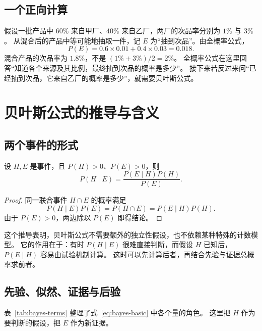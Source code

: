 \documentclass[UTF8]{ctexart}
\begin{document}
\subsection{一个正向计算}

假设一批产品中 $60\%$ 来自甲厂、$40\%$ 来自乙厂，两厂的次品率分别为 $1\%$ 与 $3\%$。
从混合后的产品中等可能地抽取一件，记 $E$ 为“抽到次品”。由全概率公式，
\[
  P(E)=0.6\times0.01+0.4\times0.03=0.018.
\]
混合产品的次品率为 $1.8\%$，不是 $(1\%+3\%)/2=2\%$。
全概率公式在这里回答“知道各个来源及其比例，最终抽到次品的概率是多少”。
接下来若反过来问“已经抽到次品，它来自乙厂的概率是多少”，就需要贝叶斯公式。

\section{贝叶斯公式的推导与含义}
\label{sec:bayes-formula}

\subsection{两个事件的形式}

\begin{theorem}[贝叶斯公式]
\label{thm:bayes-basic}
设 $H,E$ 是事件，且 $P(H)>0$、$P(E)>0$，则
\begin{equation}
  P(H\mid E)=\frac{P(E\mid H)P(H)}{P(E)}.
  \label{eq:bayes-basic}
\end{equation}
\end{theorem}
\begin{proof}
同一联合事件 $H\cap E$ 的概率满足
\[
  P(H\mid E)P(E)=P(H\cap E)=P(E\mid H)P(H).
\]
由于 $P(E)>0$，两边除以 $P(E)$ 即得结论。
\end{proof}

这个推导表明，贝叶斯公式不需要额外的独立性假设，也不依赖某种特殊的计数模型。
它的作用在于：有时 $P(H\mid E)$ 很难直接判断，而假设 $H$ 已知后，$P(E\mid H)$ 容易由试验机制计算。
这时可以先计算后者，再结合先验与证据总概率求前者。

\subsection{先验、似然、证据与后验}

表~\ref{tab:bayes-terms} 整理了式~\eqref{eq:bayes-basic} 中各个量的角色。
这里把 $H$ 作为要判断的假设，把 $E$ 作为新证据。
\end{document}
